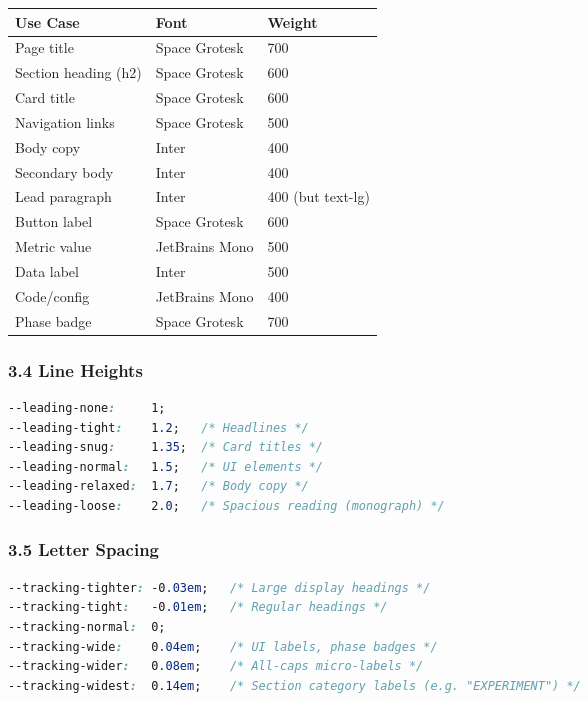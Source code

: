 \documentclass[11pt,a4paper]{article}
\begin{document}
\begin{longtable}{lll}
\toprule
Use Case & Font & Weight \\
\midrule
\endhead
Page title & Space Grotesk & 700 \\
Section heading (h2) & Space Grotesk & 600 \\
Card title & Space Grotesk & 600 \\
Navigation links & Space Grotesk & 500 \\
Body copy & Inter & 400 \\
Secondary body & Inter & 400 \\
Lead paragraph & Inter & 400 (but text-lg) \\
Button label & Space Grotesk & 600 \\
Metric value & JetBrains Mono & 500 \\
Data label & Inter & 500 \\
Code/config & JetBrains Mono & 400 \\
Phase badge & Space Grotesk & 700 \\
\bottomrule
\end{longtable}

\subsubsection*{3.4 Line Heights}

\begin{lstlisting}[language=css]
--leading-none:     1;
--leading-tight:    1.2;   /* Headlines */
--leading-snug:     1.35;  /* Card titles */
--leading-normal:   1.5;   /* UI elements */
--leading-relaxed:  1.7;   /* Body copy */
--leading-loose:    2.0;   /* Spacious reading (monograph) */
\end{lstlisting}

\subsubsection*{3.5 Letter Spacing}

\begin{lstlisting}[language=css]
--tracking-tighter: -0.03em;   /* Large display headings */
--tracking-tight:   -0.01em;   /* Regular headings */
--tracking-normal:  0;
--tracking-wide:    0.04em;    /* UI labels, phase badges */
--tracking-wider:   0.08em;    /* All-caps micro-labels */
--tracking-widest:  0.14em;    /* Section category labels (e.g. "EXPERIMENT") */
\end{lstlisting}
\end{document}
